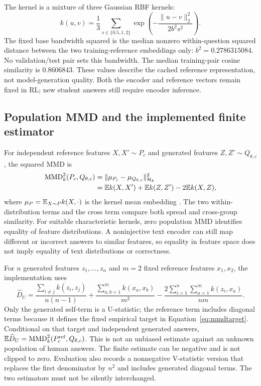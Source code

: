 The kernel is a mixture of three Gaussian RBF kernels:
\begin{equation}
 k(u,v)=\frac13\sum_{s\in\{0.5,1,2\}}
      \exp\!\left(-\frac{\|u-v\|_2^2}{2b^2s^2}\right).
 \label{eq:mmdkernel}
\end{equation}
The fixed base bandwidth squared is the median nonzero within-question
squared distance between the two training-reference embeddings only:
$b^2=0.2786315084$. No validation/test pair sets this bandwidth.
The median training-pair cosine similarity is 0.8606843. These values
describe the cached reference representation, not model-generation
quality. Both the encoder and reference vectors remain fixed in RL;
new student answers still require encoder inference.

\subsection{Population MMD and the implemented finite estimator}
For independent reference features $X,X'\sim P_c$ and generated
features $Z,Z'\sim Q_{\theta,c}$, the squared MMD is
\begin{align}
 \operatorname{MMD}_k^2(P_c,Q_{\theta,c})
 &=\|\mu_{P_c}-\mu_{Q_{\theta,c}}\|_{\mathcal H_k}^2\nonumber\\
 &=\mathbb{E} k(X,X')+\mathbb{E} k(Z,Z')-2\mathbb{E} k(X,Z),
 \label{eq:mmdpopulation}
\end{align}
where $\mu_P=\mathbb{E}_{X\sim P}k(X,\cdot)$ is the kernel mean embedding
\cite{gretton2012}. The two within-distribution terms and the cross term
compare both spread and cross-group similarity. For suitable
characteristic kernels, zero population MMD identifies equality of
feature distributions. A noninjective text encoder can still map
different or incorrect answers to similar features, so equality in
feature space does not imply equality of text distributions or correctness.

For $n$ generated features $z_1,\ldots,z_n$ and $m=2$ fixed reference
features $x_1,x_2$, the implementation uses
\begin{equation}
 \widehat D_U=
 \frac{\sum_{i\ne j}k(z_i,z_j)}{n(n-1)}
 +\frac{\sum_{a,b=1}^{m}k(x_a,x_b)}{m^2}
 -\frac{2\sum_{i=1}^{n}\sum_{a=1}^{m}k(z_i,x_a)}{nm}.
 \label{eq:mmdestimator}
\end{equation}
Only the generated self-term is a U-statistic; the reference term
includes diagonal terms because it defines the fixed empirical target
in Equation~\eqref{eq:mmdtarget}. Conditional on that target and
independent generated answers, $\mathbb{E}\widehat D_U=
\operatorname{MMD}_k^2(P_c^{\mathrm{ref}},Q_{\theta,c})$.
This is not an unbiased estimate against an unknown population of human
answers. The finite estimate can be negative and is not clipped to zero.
Evaluation also records a nonnegative V-statistic version that replaces
the first denominator by $n^2$ and includes generated diagonal terms.
The two estimators must not be silently interchanged.

